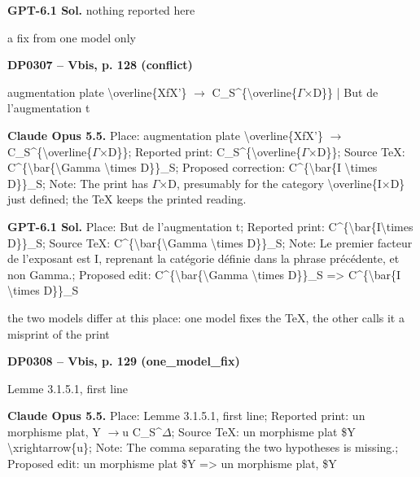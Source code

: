 \textbf{GPT-6.1 Sol.} nothing reported here\par
a fix from one model only\par
\par\noindent\hypertarget{DP0307}{}\textbf{DP0307 -- Vbis, p. 128 (conflict)}\par
augmentation plate \textbackslash{}overline\{XfX'\} \ensuremath{\to} C\_S\textasciicircum{}\{\textbackslash{}overline\{\ensuremath{\Gamma}\ensuremath{\times}D\}\} | But de l'augmentation t\par
\textbf{Claude Opus 5.5.} Place: augmentation plate \textbackslash{}overline\{XfX'\} \ensuremath{\to} C\_S\textasciicircum{}\{\textbackslash{}overline\{\ensuremath{\Gamma}\ensuremath{\times}D\}\}; Reported print: C\_S\textasciicircum{}\{\textbackslash{}overline\{\ensuremath{\Gamma}\ensuremath{\times}D\}\}; Source TeX: C\textasciicircum{}\{\textbackslash{}bar\{\textbackslash{}Gamma \textbackslash{}times D\}\}\_S; Proposed correction: C\textasciicircum{}\{\textbackslash{}bar\{I \textbackslash{}times D\}\}\_S; Note: The print has \ensuremath{\Gamma}\ensuremath{\times}D, presumably for the category \textbackslash{}overline\{I\ensuremath{\times}D\} just defined; the TeX keeps the printed reading.\par
\textbf{GPT-6.1 Sol.} Place: But de l'augmentation t; Reported print: C\textasciicircum{}\{\textbackslash{}bar\{I\textbackslash{}times D\}\}\_S; Source TeX: C\textasciicircum{}\{\textbackslash{}bar\{\textbackslash{}Gamma \textbackslash{}times D\}\}\_S; Note: Le premier facteur de l'exposant est I, reprenant la catégorie définie dans la phrase précédente, et non Gamma.; Proposed edit: C\textasciicircum{}\{\textbackslash{}bar\{\textbackslash{}Gamma \textbackslash{}times D\}\}\_S =\allowbreak > C\textasciicircum{}\{\textbackslash{}bar\{I \textbackslash{}times D\}\}\_S\par
the two models differ at this place: one model fixes the TeX, the other calls it a misprint of the print\par
\par\noindent\hypertarget{DP0308}{}\textbf{DP0308 -- Vbis, p. 129 (one\_model\_fix)}\par
Lemme 3.1.5.1, first line\par
\textbf{Claude Opus 5.5.} Place: Lemme 3.1.5.1, first line; Reported print: un morphisme plat, Y \ensuremath{\to}u C\_S\textasciicircum{}\ensuremath{\Delta}; Source TeX: un morphisme plat \$Y \textbackslash{}xrightarrow\{u\}; Note: The comma separating the two hypotheses is missing.; Proposed edit: un morphisme plat \$Y =\allowbreak > un morphisme plat, \$Y\par
